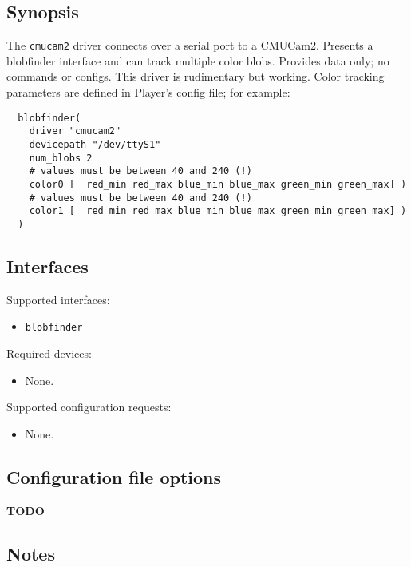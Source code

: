 \subsection*{Synopsis}
The {\tt cmucam2} driver connects over a serial port to a
CMUCam2. Presents a blobfinder interface and can track multiple
color blobs. Provides data only; no commands or configs. This driver
is rudimentary but working. Color tracking parameters are defined in
Player's config file; for example:

\begin{verbatim}
  blobfinder(
    driver "cmucam2"
    devicepath "/dev/ttyS1"
    num_blobs 2
    # values must be between 40 and 240 (!)
    color0 [  red_min red_max blue_min blue_max green_min green_max] )
    # values must be between 40 and 240 (!)
    color1 [  red_min red_max blue_min blue_max green_min green_max] )  
  )
\end{verbatim}

\subsection*{Interfaces}

\noindent Supported interfaces:
\begin{itemize}
\item {\tt blobfinder}
\end{itemize}

\noindent Required devices:
\begin{itemize}
\item None.
\end{itemize}

\noindent Supported configuration requests:
\begin{itemize}
\item None.
\end{itemize}

\subsection*{Configuration file options}
{\bf TODO}

\subsection*{Notes}
